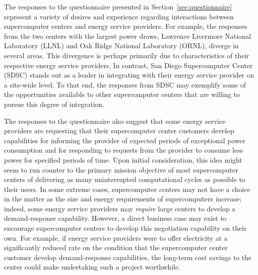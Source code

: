 The responses to the questionnaire presented in
Section~\ref{sec:questionnaire} represent a variety of desires and
experience regarding interactions between supercomputer centers and
energy service providers.  For example, the responses from the two centers
with the largest power draws, Lawrence Livermore National Laboratory
(LLNL) and Oak Ridge National Laboratory (ORNL), diverge in several
areas.  This divergence is perhaps primarily due to characteristics of
their respective energy service providers.  In contrast, San Diego
Supercomputer Center (SDSC) stands out as a leader in integrating
with their energy service provider on a site-wide level.  To that end, the
responses from SDSC may exemplify some of the opportunities available
to other supercomputer centers that are willing to pursue this degree
of integration.

The responses to the questionnaire also suggest that some energy service
providers are requesting that their supercomputer center customers
develop capabilities for informing the provider of expected periods of
exceptional power consumption and for responding to requests from the
provider to consume less power for specified periods of time.  Upon
initial consideration, this idea might seem to run counter to the
primary mission objective of most supercomputer centers of delivering
as many uninterrupted computational cycles as possible to their users.
In some extreme cases, supercomputer centers may not have a choice
in the matter as the size and energy requirements of supercomputers
increase; indeed, some energy service providers may \textit{require} large
centers to develop a demand-response capability.  However, a direct
business case may exist to encourage supercomputer centers to develop
this negotiation capability on their own.  For example, if energy service
providers were to offer electricity at a significantly reduced rate
on the condition that the supercomputer center customer develop
demand-response capabilities, the long-term cost savings to the
center could make undertaking such a project worthwhile.

